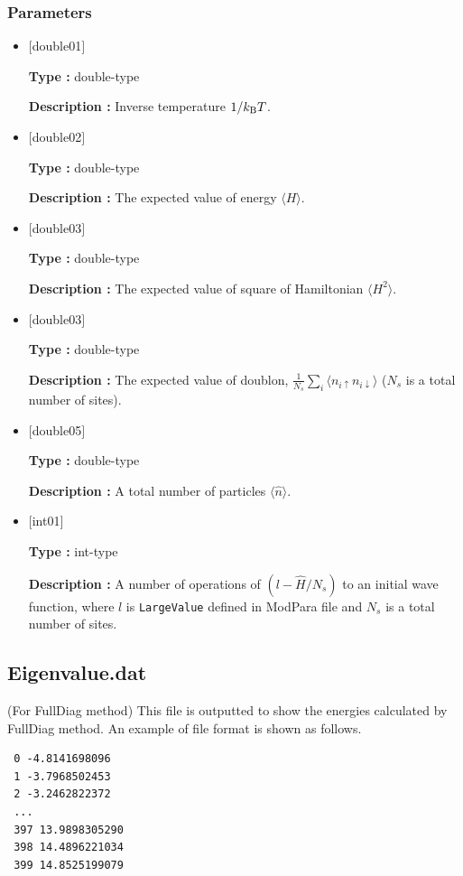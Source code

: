 \subsubsection{Parameters}
 \begin{itemize}

  \item  $[$double01$]$
  
 {\bf Type :} double-type

{\bf Description :} Inverse temperature $1/{k_{\rm B}T}$.
 
  \item $[$double02$]$

 {\bf Type :} double-type 

{\bf Description :}  The expected value of  energy $\langle H \rangle$.

  \item $[$double03$]$

 {\bf Type :} double-type 

{\bf Description :} The expected value of square of Hamiltonian $\langle H^2 \rangle$. 

  \item $[$double03$]$

 {\bf Type :} double-type 

{\bf Description :} The expected value of doublon, 
$\frac{1}{N_s} \sum_{i}\langle n_{i\uparrow}n_{i\downarrow}\rangle$ ($N_{s}$ is a total number of sites).

  \item $[$double05$]$

 {\bf Type :} double-type 

{\bf Description :} A total number of particles $\langle {\hat n} \rangle$.


  \item $[$int01$]$

 {\bf Type :} int-type 

{\bf Description :} A number of operations of $(l-\hat{H}/N_{s})$ to an initial wave function, where $l$ is \verb|LargeValue| defined in ModPara file and $N_{s}$ is a total number of sites.

 \end{itemize}


\newpage
\subsection{Eigenvalue.dat}
\label{Subsec:eigenvalue}
(For FullDiag method) This file is outputted to show the energies calculated by FullDiag method. An example of file format is shown as follows.\\
\begin{minipage}{12.5cm}
\begin{screen}
\begin{verbatim}
 0 -4.8141698096 
 1 -3.7968502453 
 2 -3.2462822372 
 ...
 397 13.9898305290 
 398 14.4896221034 
 399 14.8525199079 
\end{verbatim}
\end{screen}
\end{minipage}

